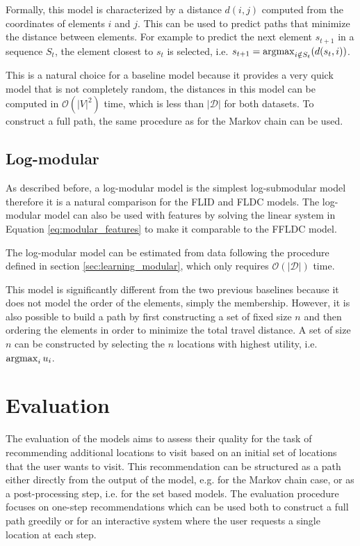 Formally, this model is characterized by a distance $d(i,j)$ computed from the coordinates of elements $i$ and $j$. This can be used to predict paths that minimize the distance between elements. For example to predict the next element $s_{t+1}$ in a sequence $S_{t}$, the element closest to $s_{t}$ is selected, i.e. $s_{t+1} = \operatorname*{argmax}_{i \notin S_{t}}(d(s_{t}, i))$.

This is a natural choice for a baseline model because it provides a very quick model that is not completely random, the distances in this model can be computed in $\mathcal{O}(|V|^{2})$ time, which is less than $|\mathcal{D}|$ for both datasets. To construct a full path, the same procedure as for the Markov chain can be used.

\subsection{Log-modular}

As described before, a log-modular model is the simplest log-submodular model therefore it is a natural comparison for the FLID and FLDC models. The log-modular model can also be used with features by solving the linear system in Equation \eqref{eq:modular_features} to make it comparable to the FFLDC model.

The log-modular model can be estimated from data following the procedure defined in section \ref{sec:learning_modular}, which only requires $\mathcal{O}(|\mathcal{D}|)$ time.

This model is significantly different from the two previous baselines because it does not model the order of the elements, simply the membership. However, it is also possible to build a path by first constructing a set of fixed size $n$ and then ordering the elements in order to minimize the total travel distance. A set of size $n$ can be constructed by selecting the $n$ locations with highest utility, i.e. $\operatorname*{argmax}_{i} u_{i}$.

\section{Evaluation}
\label{sec:evaluation}

The evaluation of the models aims to assess their quality for the task of recommending additional locations to visit based on an initial set of locations that the user wants to visit. This recommendation can be structured as a path either directly from the output of the model, e.g. for the Markov chain case, or as a post-processing step, i.e. for the set based models. The evaluation procedure focuses on one-step recommendations which can be used both to construct a full path greedily or for an interactive system where the user requests a single location at each step.

